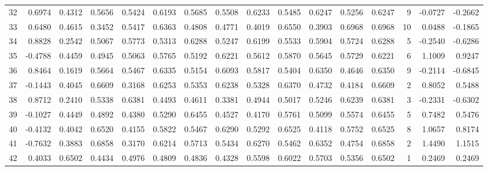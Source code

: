 \begin{tabular}{lrrrrrrrrrrrrrrr}
32  &      0.6974 &  0.4312 &  0.5656 &  0.5424 &  0.6193 &  0.5685 &  0.5508 &  0.6233 &  0.5485 &  0.6247 &   0.5256 &     0.6247 &      9 &                   -0.0727 &                    -0.2662 \\
33  &      0.6480 &  0.4615 &  0.3452 &  0.5417 &  0.6363 &  0.4808 &  0.4771 &  0.4019 &  0.6550 &  0.3903 &   0.6968 &     0.6968 &     10 &                    0.0488 &                    -0.1865 \\
34  &      0.8828 &  0.2542 &  0.5067 &  0.5773 &  0.5313 &  0.6288 &  0.5247 &  0.6199 &  0.5533 &  0.5904 &   0.5724 &     0.6288 &      5 &                   -0.2540 &                    -0.6286 \\
35  &     -0.4788 &  0.4459 &  0.4945 &  0.5063 &  0.5765 &  0.5192 &  0.6221 &  0.5612 &  0.5870 &  0.5645 &   0.5729 &     0.6221 &      6 &                    1.1009 &                     0.9247 \\
36  &      0.8464 &  0.1619 &  0.5664 &  0.5467 &  0.6335 &  0.5154 &  0.6093 &  0.5817 &  0.5404 &  0.6350 &   0.4646 &     0.6350 &      9 &                   -0.2114 &                    -0.6845 \\
37  &     -0.1443 &  0.4045 &  0.6609 &  0.3168 &  0.6253 &  0.5353 &  0.6238 &  0.5328 &  0.6370 &  0.4732 &   0.4184 &     0.6609 &      2 &                    0.8052 &                     0.5488 \\
38  &      0.8712 &  0.2410 &  0.5338 &  0.6381 &  0.4493 &  0.4611 &  0.3381 &  0.4944 &  0.5017 &  0.5246 &   0.6239 &     0.6381 &      3 &                   -0.2331 &                    -0.6302 \\
39  &     -0.1027 &  0.4449 &  0.4892 &  0.4380 &  0.5290 &  0.6455 &  0.4527 &  0.4170 &  0.5761 &  0.5099 &   0.5574 &     0.6455 &      5 &                    0.7482 &                     0.5476 \\
40  &     -0.4132 &  0.4042 &  0.6520 &  0.4155 &  0.5822 &  0.5467 &  0.6290 &  0.5292 &  0.6525 &  0.4118 &   0.5752 &     0.6525 &      8 &                    1.0657 &                     0.8174 \\
41  &     -0.7632 &  0.3883 &  0.6858 &  0.3170 &  0.6214 &  0.5713 &  0.5434 &  0.6270 &  0.5462 &  0.6352 &   0.4754 &     0.6858 &      2 &                    1.4490 &                     1.1515 \\
42  &      0.4033 &  0.6502 &  0.4434 &  0.4976 &  0.4809 &  0.4836 &  0.4328 &  0.5598 &  0.6022 &  0.5703 &   0.5356 &     0.6502 &      1 &                    0.2469 &                     0.2469 \\

\end{tabular}

